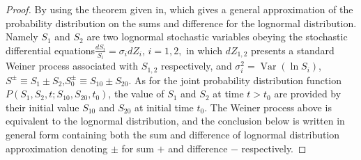 \documentclass[letterpaper]{article} %
\begin{document}
\begin{appendices}
\begin{proof}
By using the theorem given in\cite{lo2012sum}, which gives a general approximation of the probability distribution on the sums and difference for the lognormal distribution. Namely $S_1$ and $S_2$ are two lognormal stochastic variables obeying the stochastic differential equations$\frac{d S_{i}}{S_{i}}=\sigma_{i} d Z_{i}$, $i=1,2,$ in which $dZ_{1,2}$ presents a standard Weiner process associated with $S_{1,2}$ respectively, and $\sigma_{i}^{2}=\operatorname{Var}\left(\ln S_{i}\right)$, $S^{\pm} \equiv S_{1} \pm S_{2}$,$S_0^{\pm} \equiv S_{10} \pm S_{20}$. As for the joint probability distribution function $P\left(S_{1}, S_{2}, t ; S_{10}, S_{20}, t_{0}\right)$, the value of $S_1$ and $S_2$ at time $t>t_0$ are provided by their initial value $S_{10}$ and $S_{20}$ at initial time $t_0$. The Weiner process above is equivalent to the lognormal distribution\cite{weiner1984meaning}, and the conclusion below is written in general form containing both the sum and difference of lognormal distribution approximation denoting $\pm$ for sum $+$ and difference $-$ respectively.
 

\end{proof}
\end{appendices}
\end{document}

